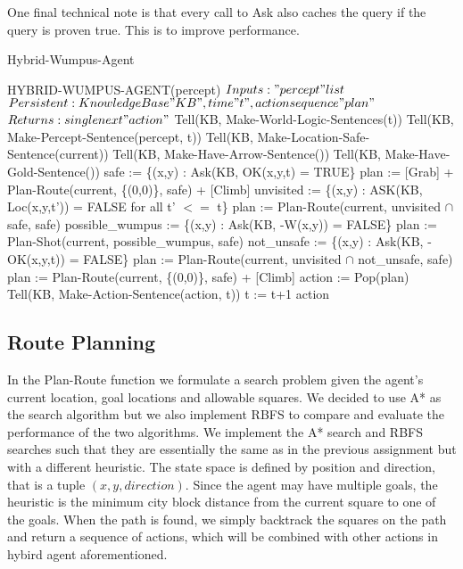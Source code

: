 One final technical note is that every call to Ask also caches the query if the query is proven true. This is to improve performance.

\begin{algorithm}[H]
\caption{Hybrid-Wumpus-Agent}
\label{hybridalg}
\begin{algorithmic}
\STATE HYBRID-WUMPUS-AGENT(percept)
\STATE $Inputs: "percept" list$
\STATE $Persistent: Knowledge Base "KB", time "t", action sequence "plan"$
\STATE $Returns: single next "action"$
\STATE Tell(KB, Make-World-Logic-Sentences(t))
\STATE Tell(KB, Make-Percept-Sentence(percept, t))
\STATE Tell(KB, Make-Location-Safe-Sentence(current))
\STATE Tell(KB, Make-Have-Arrow-Sentence())
\STATE Tell(KB, Make-Have-Gold-Sentence())
\STATE safe := \{(x,y) : Ask(KB, OK(x,y,t) = TRUE\}
	\STATE plan := {[}Grab{]} + Plan-Route(current, \{(0,0)\}, safe) + {[}Climb{]}
\ENDIF
{}
	\STATE unvisited := \{(x,y) : ASK(KB, Loc(x,y,t')) = FALSE for all t' $<=$ t\}
	\STATE plan := Plan-Route(current, unvisited $\cap$ safe, safe)
\ENDIF
{}
	\STATE possible\_wumpus := \{(x,y) : Ask(KB, -W(x,y)) = FALSE\}
	\STATE plan := Plan-Shot(current, possible\_wumpus, safe)
\ENDIF
{}
	\STATE not\_unsafe := \{(x,y) : Ask(KB, -OK(x,y,t)) = FALSE\}
	\STATE plan := Plan-Route(current, unvisited $\cap$ not\_unsafe, safe)
\ENDIF
{}
	\STATE plan := Plan-Route(current, \{(0,0)\}, safe) + {[}Climb{]}
\ENDIF
\STATE action := Pop(plan)
\STATE Tell(KB, Make-Action-Sentence(action, t))
\STATE t := t+1
\RETURN action
\end{algorithmic}
\end{algorithm}

\subsection{Route Planning}

In the Plan-Route function we formulate a search problem given the agent's current location, goal locations and allowable squares. We decided to use A* as the search algorithm but we also implement RBFS to compare and evaluate the performance of the two algorithms.  We implement the A* search and RBFS searches such that they are essentially the same as in the previous assignment but with a different heuristic. The state space is defined by position and direction, that is a tuple $(x,y,direction)$. Since the agent may have multiple goals, the heuristic is the minimum city block distance from the current square to one of the goals. When the path is found, we simply backtrack the squares on the path and return a sequence of actions, which will be combined with other actions in hybird agent aforementioned.

